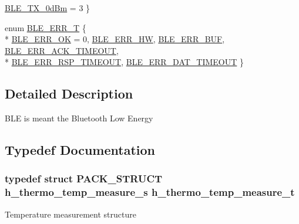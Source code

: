 \begin{DoxyCompactItemize}
\hyperlink{group___b_l_e_gga3b6d6db9e13e93ae21f2a383d9903617a657bee3a9a945c511d573971038ccd54}{B\-L\-E\-\_\-\-T\-X\-\_\-0d\-Bm} = 3
 \}
\item 
enum \hyperlink{group___b_l_e_ga6c00522f6a8c33135ee0414877d42c04}{B\-L\-E\-\_\-\-E\-R\-R\-\_\-\-T} \{ \\*
\hyperlink{group___b_l_e_gga6c00522f6a8c33135ee0414877d42c04a4b3ee10917919fa72598e8c8a0131342}{B\-L\-E\-\_\-\-E\-R\-R\-\_\-\-O\-K} = 0, 
\hyperlink{group___b_l_e_gga6c00522f6a8c33135ee0414877d42c04aaa0c52ac5b1905e8035c78aeed3d1db4}{B\-L\-E\-\_\-\-E\-R\-R\-\_\-\-H\-W}, 
\hyperlink{group___b_l_e_gga6c00522f6a8c33135ee0414877d42c04a54530870fb2878254b47f1e0650456ef}{B\-L\-E\-\_\-\-E\-R\-R\-\_\-\-B\-U\-F}, 
\hyperlink{group___b_l_e_gga6c00522f6a8c33135ee0414877d42c04aaa3bd3b90312f5e85fc132b5d4a1a62a}{B\-L\-E\-\_\-\-E\-R\-R\-\_\-\-A\-C\-K\-\_\-\-T\-I\-M\-E\-O\-U\-T}, 
\\*
\hyperlink{group___b_l_e_gga6c00522f6a8c33135ee0414877d42c04a1cf05a76d9f21338d5297bbc4bcbc355}{B\-L\-E\-\_\-\-E\-R\-R\-\_\-\-R\-S\-P\-\_\-\-T\-I\-M\-E\-O\-U\-T}, 
\hyperlink{group___b_l_e_gga6c00522f6a8c33135ee0414877d42c04ac08af44027b924f6026dac945b00cbac}{B\-L\-E\-\_\-\-E\-R\-R\-\_\-\-D\-A\-T\-\_\-\-T\-I\-M\-E\-O\-U\-T}
 \}
\end{DoxyCompactItemize}


\subsection{Detailed Description}
B\-L\-E is meant the Bluetooth Low Energy 

\subsection{Typedef Documentation}
\hypertarget{group___b_l_e_ga29b646d2e9db814fb80f36bfeeec82d1}{
\subsubsection[{h\-\_\-thermo\-\_\-temp\-\_\-measure\-\_\-t}]{\setlength{\rightskip}{0pt plus 5cm}typedef struct P\-A\-C\-K\-\_\-\-S\-T\-R\-U\-C\-T {\bf h\-\_\-thermo\-\_\-temp\-\_\-measure\-\_\-s} {\bf h\-\_\-thermo\-\_\-temp\-\_\-measure\-\_\-t}}}\label{group___b_l_e_ga29b646d2e9db814fb80f36bfeeec82d1}
Temperature measurement structure 

